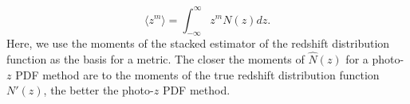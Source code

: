 \begin{equation}
\langle z^{m}\rangle = \int_{-\infty}^{\infty}z^{m}N(z)dz.
\end{equation}
Here, we use the moments of the stacked estimator of the redshift distribution function as the basis for a metric. The closer the moments of $\hat{N}(z)$ for a photo-$z$ PDF method are to the moments of the true redshift distribution function $N'(z)$, the better the photo-$z$ PDF method.

